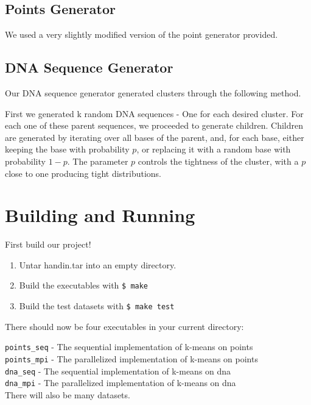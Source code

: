 \documentclass[12pt]{article}
\begin{document}
\subsection{Points Generator}

We used a very slightly modified version of the point generator provided.

\subsection{DNA Sequence Generator}

Our DNA sequence generator generated clusters through the following method.

First we generated k random DNA sequences - One for each desired cluster. For each one of these parent sequences, we proceeded to generate children. Children are generated by iterating over all bases of the parent, and, for each base, either keeping the base with probability $p$, or replacing it with a random base with probability $1-p$. The parameter $p$ controls the tightness of the cluster, with a $p$ close to one producing tight distributions.

\section{Building and Running}
 
First build our project!

\begin{enumerate}
\item Untar handin.tar into an empty directory.
\item Build the executables with \texttt{\$ make}
\item Build the test datasets with \texttt{\$ make test}
\end{enumerate}

There should now be four executables in your current directory: 


\texttt{points\_seq} - The sequential implementation of k-means on points \\
\texttt{points\_mpi} - The parallelized implementation of k-means on points \\
\texttt{dna\_seq} - The sequential implementation of k-means on dna \\
\texttt{dna\_mpi} - The parallelized implementation of k-means on dna \\

There will also be many datasets.
\end{document}
